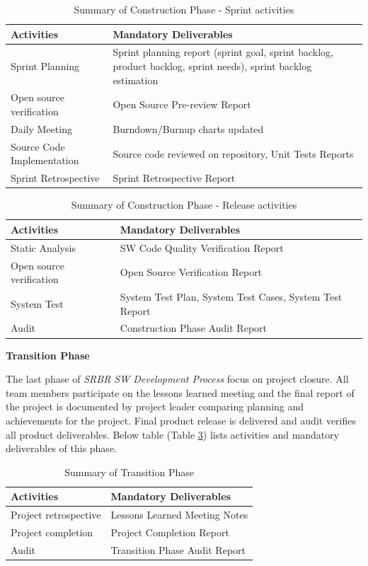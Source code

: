 \begin{table}[h]
  \caption{Summary of Construction Phase - Sprint activities }
  \label{tab:construction-sprint}
  \begin{tabular}{p{2.5cm}p{5.5cm}}
    \toprule
    Activities&Mandatory Deliverables\\
    \midrule
    Sprint Planning & Sprint planning report (sprint goal, sprint backlog, product backlog, sprint needs), sprint backlog estimation\\
    Open source verification & Open Source Pre-review Report\\
    Daily Meeting & Burndown/Burnup charts updated\\
    Source Code Implementation & Source code reviewed on repository, Unit Tests Reports \\
    Sprint Retrospective & Sprint Retrospective Report\\
  \bottomrule
\end{tabular}
\end{table}

\begin{table}[h]
  \caption{Summary of Construction Phase - Release activities}
  \label{tab:construction-release}
  \begin{tabular}{p{3.5cm}p{4.5cm}}
    \toprule
    Activities&Mandatory Deliverables\\
    \midrule
    Static Analysis & SW Code Quality Verification Report\\
    Open source verification & Open Source Verification Report\\
    System Test & System Test Plan, System Test Cases, System Test Report\\
    Audit & Construction Phase Audit Report\\
  \bottomrule
\end{tabular}
\end{table}

\textbf{Transition Phase}

The last phase of \textit{SRBR SW Development Process} focus on project closure. All team members participate on the lessons learned meeting and the final report of the project is documented by project leader comparing planning and achievements for the project. Final product release is delivered and audit verifies all product deliverables. Below  table (Table \ref{tab:transition}) lists activities and mandatory deliverables of this phase.

\begin{table}[h]
  \caption{Summary of Transition Phase}
  \label{tab:transition}
  \begin{tabular}{p{2.5cm}p{5.5cm}}
    \toprule
    Activities&Mandatory Deliverables\\
    \midrule
    Project retrospective & Lessons Learned Meeting Notes\\
    Project completion & Project Completion Report\\
    Audit & Transition Phase Audit Report\\
  \bottomrule
\end{tabular}
\end{table}

